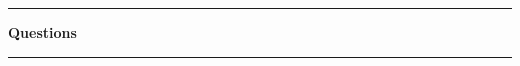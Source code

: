 \documentclass[a4paper]{article}
\begin{document}
\begin{examcopy}[125]
  \begin{center}
    \hrule\vspace{2mm}
    \bf\Large Questions
    \vspace{1mm}
    \hrule
    \bigskip
  \end{center}


  \clearpage

\end{examcopy}
\end{document}
